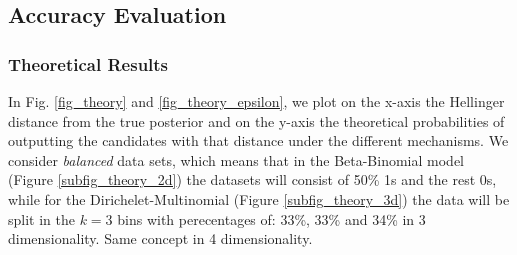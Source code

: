 \documentclass{article}
\begin{document}




\subsection{Accuracy Evaluation}
\subsubsection{Theoretical Results}
In Fig. \ref{fig_theory} and \ref{fig_theory_epsilon}, we plot on the x-axis the Hellinger distance from the true posterior and on the y-axis the theoretical probabilities of outputting the candidates with that distance under the different mechanisms. We consider \emph{balanced} data sets, which means that in the Beta-Binomial model (Figure \ref{subfig_theory_2d}) the datasets will consist of 50\% 1s and the rest 0s, while for the
Dirichelet-Multinomial (Figure  \ref{subfig_theory_3d})
the data will be split in the $k=3$ bins with perecentages of: 33\%, 33\% and 34\% in 3 dimensionality. Same concept in 4 dimensionality.
\end{document}

